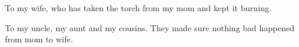 \begin{dedication}
   
   To my wife, who has taken the torch from my mom and kept it burning.

To my uncle, my aunt and my cousins. They made sure nothing bad happened from mom to wife.\end{dedication}